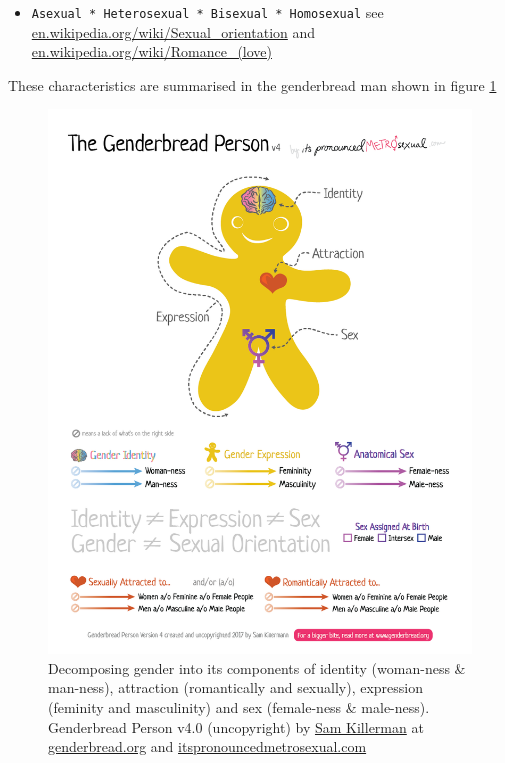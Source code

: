 \documentclass[
]{book}
\providecommand{\tightlist}{%
  \setlength{\itemsep}{0pt}\setlength{\parskip}{0pt}}
\begin{document}
\begin{enumerate}
  \begin{itemize}
  \tightlist
  \item
    \texttt{Asexual\ *\ Heterosexual\ *\ Bisexual\ *\ Homosexual} see \href{https://en.wikipedia.org/wiki/Sexual_orientation}{en.wikipedia.org/wiki/Sexual\_orientation} and \href{https://en.wikipedia.org/wiki/Romance_(love)}{en.wikipedia.org/wiki/Romance\_(love)}
  \end{itemize}
\end{enumerate}

These characteristics are summarised in the genderbread man shown in figure \ref{fig:genderbread-fig}

\begin{figure}

{\centering \includegraphics[width=1\linewidth]{images/Genderbread-Person-v4} 

}

\caption{Decomposing gender into its components of identity (woman-ness \& man-ness), attraction (romantically and sexually), expression (feminity and masculinity) and sex (female-ness \& male-ness). Genderbread Person v4.0 (uncopyright) by \href{https://www.samkillermann.com/}{Sam Killerman} at \href{https://www.genderbread.org/}{genderbread.org} and \href{https://www.itspronouncedmetrosexual.com/}{itspronouncedmetrosexual.com}}\label{fig:genderbread-fig}
\end{figure}
\end{document}
